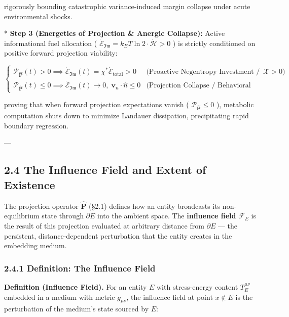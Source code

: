 \documentclass[11pt,a4paper]{article}
\theoremstyle{definition}
\theoremstyle{remark}
\begin{document}
rigorously bounding catastrophic variance-induced margin collapse under acute environmental shocks.

* \textbf{Step 3 (Energetics of Projection \& Anergic Collapse):}
Active informational fuel allocation ( $\dot{\mathcal{E}}_{\mathfrak{Im}} = k_B T \ln 2 \cdot \dot{\mathcal{H}} > 0$ ) is strictly conditioned on positive forward projection viability:


\begin{equation}
\boxed{\begin{cases}
\mathcal{P}_{\hat{\mathbf{P}}}(t) > 0 \implies \dot{\mathcal{E}}_{\mathfrak{Im}}(t) = \chi^* \dot{\mathcal{E}}_{\text{total}} > 0 & \text{(Proactive Negentropy Investment / Exploratory Expression } \boldsymbol{\mathcal{X}} > 0\text{)} \\
\mathcal{P}_{\hat{\mathbf{P}}}(t) \le 0 \implies \dot{\mathcal{E}}_{\mathfrak{Im}}(t) \longrightarrow 0, \; \mathbf{v}_n \cdot \hat{n} \le 0 & \text{(Projection Collapse / Behavioral Withdrawal  and  Anergic Lysis)}
\end{cases}}
\end{equation}


proving that when forward projection expectations vanish ( $\mathcal{P}_{\hat{\mathbf{P}}} \le 0$ ), metabolic computation shuts down to minimize Landauer dissipation, precipitating rapid boundary regression.

---

\subsection{2.4 The Influence Field and Extent of Existence}

The projection operator $\hat{\mathbf{P}}$ (\S 2.1) defines how an entity broadcasts its non-equilibrium state through $\partial E$ into the ambient space. The \textbf{influence field} $\mathcal{F}_E$ is the result of this projection evaluated at arbitrary distance from $\partial E$ — the persistent, distance-dependent perturbation that the entity creates in the embedding medium.

\subsubsection{2.4.1 Definition: The Influence Field}

\textbf{Definition (Influence Field).} For an entity $E$ with stress-energy content $T^{\mu\nu}_E$ embedded in a medium with metric $g_{\mu\nu}$, the influence field at point $x \notin E$ is the perturbation of the medium's state sourced by $E$:
\end{document}
